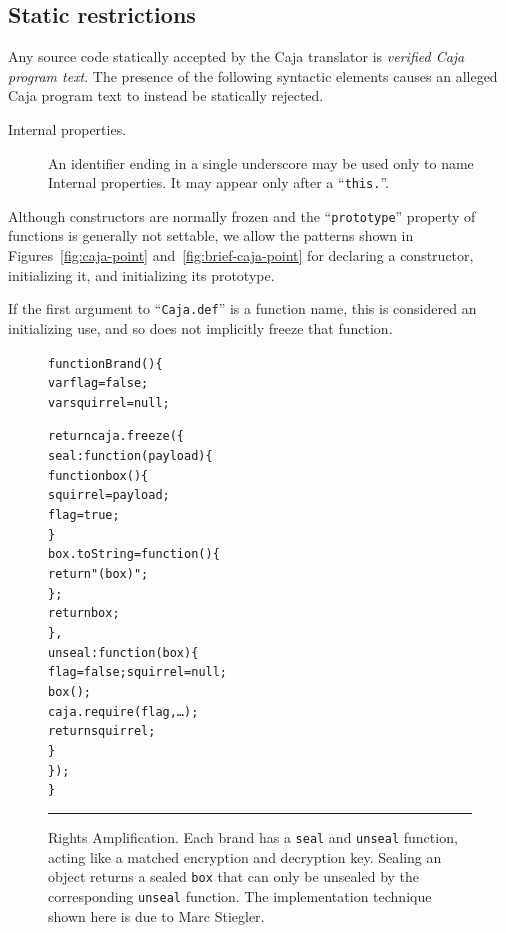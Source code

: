 \documentclass[letterpaper,twocolumn,10pt]{article}
\newcommand{\code}[1]{{\tt {#1}}}              %
\begin{document}
\subsection{Static restrictions}

Any source code statically accepted by the Caja translator is \emph{verified 
Caja program text}. The presence of the following syntactic elements causes 
an alleged Caja program text to instead be statically rejected.

\begin{description}

    \item[Internal properties.] An identifier ending in a single underscore 
    may be used only to name Internal properties. It may appear only after a 
    ``\code{this.}''.

\end{description}

Although constructors are normally frozen and the ``\code{prototype}'' 
property of functions is generally not settable, we allow the 
patterns shown in Figures~\ref{fig:caja-point} and~\ref{fig:brief-caja-point} 
for declaring a constructor, initializing it, and initializing its prototype.

If the first argument to ``\code{Caja.def}'' is a function name, this is 
considered an initializing use, and so does not implicitly freeze that 
function. 

\begin{figure}[t!]
\begin{alltt}
function Brand() \{
  var flag = false;
  var squirrel = null;

  return caja.freeze(\{
    seal: function(payload) \{
      function box() \{
        squirrel = payload;
        flag = true;
      \}
      box.toString = function() \{
        return "(box)";
      \};
      return box;
    \},
    unseal: function(box) \{
      flag = false; squirrel = null;
      box();
      caja.require(flag,\ldots);
      return squirrel;
    \}
  \});
\}
\end{alltt}

\caption[Rights Amplification]{Rights Amplification. Each brand has a 
\code{seal} and \code{unseal} function, acting like a matched encryption and 
decryption key. Sealing an object returns a sealed \code{box} that can only 
be unsealed by the corresponding \code{unseal} function. The implementation 
technique shown here is due to Marc Stiegler.
\\ } \hrule
\label{fig:rights-amp}
\end{figure}
\end{document}
